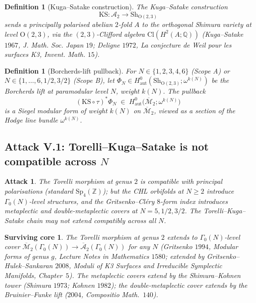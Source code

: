 \documentclass[11pt]{amsart}
\newtheorem{definition}[theorem]{Definition}
\newtheorem{attack}[theorem]{Attack}
\newtheorem{surviving}[theorem]{Surviving core}
\providecommand{\Z}{\mathbb{Z}}
\providecommand{\Q}{\mathbb{Q}}
\providecommand{\cA}{\mathcal{A}}
\providecommand{\Sp}{\mathrm{Sp}}
\providecommand{\Mbar}{\overline{\mathcal{M}}}
\providecommand{\Abar}{\overline{\mathcal{A}}}
\providecommand{\KS}{\mathrm{KS}}
\begin{document}
\begin{definition}[Kuga--Satake construction]
\label{def:ks}
The Kuga--Satake construction
\[
 \KS \colon \cA_2 \longrightarrow \mathrm{Sh}_{\mathrm{O}(2, 3)}
\]
sends a principally polarised abelian $2$-fold $A$ to the
orthogonal Shimura variety at level $\mathrm{O}(2, 3)$, via the
$(2, 3)$-Clifford algebra $\mathrm{Cl}(H^2(A; \Q))$ (Kuga--Satake
$1967$, \emph{J. Math. Soc. Japan} $19$; Deligne $1972$,
\emph{La conjecture de Weil pour les surfaces K3}, Invent. Math.
$15$).
\end{definition}

\begin{definition}[Borcherds-lift pullback]
\label{def:borch-pullback}
For $N \in \{1, 2, 3, 4, 6\}$ (Scope A) or $N \in \{1, \ldots, 6,
1/2, 3/2\}$ (Scope B), let $\Phi_N \in H_{\mathrm{aut}}^0(
\mathrm{Sh}_{\mathrm{O}(2, 3)}; \omega^{k(N)})$ be the Borcherds lift
at paramodular level $N$, weight $k(N)$. The pullback
\[
 (\KS \circ \tau)^* \Phi_N \;\in\;
 H_{\mathrm{aut}}^0\bigl(\Mbar_2; \omega^{k(N)}\bigr)
\]
is a Siegel modular form of weight $k(N)$ on $\Mbar_2$, viewed as
a section of the Hodge line bundle $\omega^{k(N)}$.
\end{definition}

\subsection{Attack V.1: Torelli--Kuga--Satake is not compatible across
$N$}

\begin{attack}
\label{att:ks-not-compatible}
The Torelli morphism at genus $2$ is compatible with principal
polarisations (standard $\Sp_4(\Z)$); but the CHL orbifolds at
$N \geq 2$ introduce $\Gamma_0(N)$-level structures, and the
Gritsenko--Cl\'ery $8$-form index introduces metaplectic and
double-metaplectic covers at $N = 5, 1/2, 3/2$. The Torelli--Kuga--
Satake chain may not extend compatibly across all $N$.
\end{attack}

\begin{surviving}
\label{surv:ks-extends-via-tower}
The Torelli morphism at genus $2$ extends to $\Gamma_0(N)$-level cover
$\Mbar_2(\Gamma_0(N)) \to \Abar_2(\Gamma_0(N))$ for any $N$
(Gritsenko $1994$, \emph{Modular forms of genus $g$}, Lecture Notes in
Mathematics $1580$; extended by Gritsenko--Hulek--Sankaran $2008$,
\emph{Moduli of K3 Surfaces and Irreducible Symplectic Manifolds},
Chapter~$5$). The metaplectic covers extend by the Shimura--Kohnen
tower (Shimura $1973$; Kohnen $1982$); the double-metaplectic cover
extends by the Bruinier--Funke lift ($2004$,
\emph{Compositio Math.}~$140$).
\end{surviving}
\end{document}
